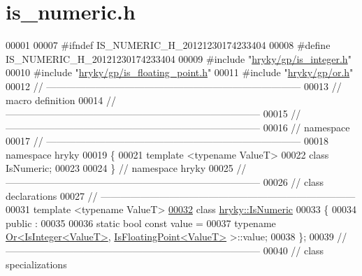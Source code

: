 \hypertarget{is__numeric_8h_source}{\section{is\-\_\-numeric.\-h}
}

\begin{DoxyCode}
00001 
00007 \textcolor{preprocessor}{#ifndef IS\_NUMERIC\_H\_20121230174233404}
00008 \textcolor{preprocessor}{}\textcolor{preprocessor}{#define IS\_NUMERIC\_H\_20121230174233404}
00009 \textcolor{preprocessor}{}\textcolor{preprocessor}{#include "\hyperlink{is__integer_8h}{hryky/gp/is_integer.h}"}
00010 \textcolor{preprocessor}{#include "\hyperlink{is__floating__point_8h}{hryky/gp/is_floating_point.h}"}
00011 \textcolor{preprocessor}{#include "\hyperlink{or_8h}{hryky/gp/or.h}"}
00012 \textcolor{comment}{//
      ------------------------------------------------------------------------------}
00013 \textcolor{comment}{// macro definition}
00014 \textcolor{comment}{//
      ------------------------------------------------------------------------------}
00015 \textcolor{comment}{//
      ------------------------------------------------------------------------------}
00016 \textcolor{comment}{// namespace}
00017 \textcolor{comment}{//
      ------------------------------------------------------------------------------}
00018 \textcolor{keyword}{namespace }hryky
00019 \{
00021     \textcolor{keyword}{template} <\textcolor{keyword}{typename} ValueT>
00022     \textcolor{keyword}{class }IsNumeric;
00023 
00024 \} \textcolor{comment}{// namespace hryky}
00025 \textcolor{comment}{//
      ------------------------------------------------------------------------------}
00026 \textcolor{comment}{// class declarations}
00027 \textcolor{comment}{//
      ------------------------------------------------------------------------------}
00031 \textcolor{comment}{}\textcolor{keyword}{template} <\textcolor{keyword}{typename} ValueT>
\hypertarget{is__numeric_8h_source_l00032}{}\hyperlink{classhryky_1_1_is_numeric}{00032} \textcolor{keyword}{class }\hyperlink{classhryky_1_1_is_numeric}{hryky::IsNumeric}
00033 \{
00034 \textcolor{keyword}{public} :
00035 
00036     \textcolor{keyword}{static} \textcolor{keywordtype}{bool} \textcolor{keyword}{const} value =
00037         \textcolor{keyword}{typename} \hyperlink{classhryky_1_1_or}{Or<IsInteger<ValueT>}, \hyperlink{classhryky_1_1_is_floating_point}{IsFloatingPoint<ValueT>} >::value;
00038 \};
00039 \textcolor{comment}{//
      ------------------------------------------------------------------------------}
00040 \textcolor{comment}{// class specializations}

\end{DoxyCode}
